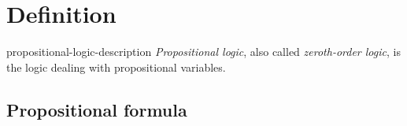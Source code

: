 \documentclass[preview]{standalone}
\begin{document}
\genpage

\section{Definition}

\begin{snippet}{propositional-logic-description}
    \textit{Propositional logic}, also called \textit{zeroth-order logic},
    is the logic dealing with propositional variables.
\end{snippet}


\subsection{Propositional formula}

\end{document}
